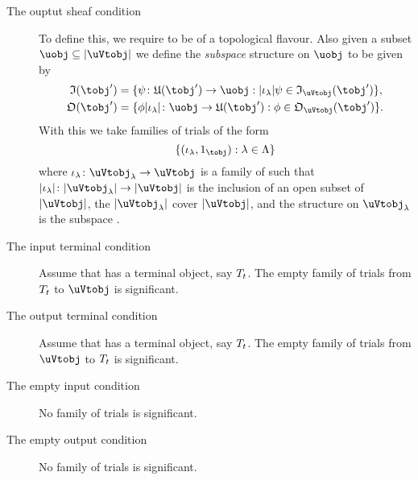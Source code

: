 \documentclass[%
a4paper,%
arxiv,%
defaults
]{myclass}
\begin{document}
\begin{defn}
\begin{description}
\item[The ouptut sheaf condition]
To define this, we require \ucat to be of a topological flavour.
Also given a subset \(\uobj \subseteq \forfunc[\uVtobj]\) we define the \emph{subspace} \Vtalgobj structure on \(\uobj\) to be given by
%
\begin{align*}
\itest(\tobj') &= \{\ifn \colon \ufunc(\tobj') \to \uobj : \forfunc[\iota_\lambda]\ifn \in \itest_{\uVtobj}(\tobj')\}, \\
%
\otest(\tobj') &= \{\ofn\forfunc[\iota_\lambda] \colon \uobj \to \ufunc(\tobj') : \ofn \in \otest_{\uVtobj}(\tobj')\}.
%
\end{align*}
%
With this we take families of trials of the form
%
\[
  \{(\iota_\lambda, 1_{\tobj}) : \lambda \in \Lambda\}
\]
%
where \(\iota_\lambda \colon \uVtobj_\lambda \to \uVtobj\) is a family of \uVtmors such that \(\forfunc[\iota_\lambda] \colon \forfunc[\uVtobj_\lambda] \to \forfunc[\uVtobj]\) is the inclusion of an open subset of \(\forfunc[\uVtobj]\), the \(\forfunc[\uVtobj_\lambda]\) cover \(\forfunc[\uVtobj]\), and the \Vtalgobj structure on \(\uVtobj_\lambda\) is the subspace \Vtalgobj.

\item[The input terminal condition]
%
Assume that \tcat has a terminal object, say \(\term{t}\).
The empty family of trials from \(\term{t}\) to \(\uVtobj\) is significant.

\item[The output terminal condition]
%
Assume that \tcat has a terminal object, say \(\term{t}\).
The empty family of trials from \(\uVtobj\) to \(\term{t}\) is significant.


\item[The empty input condition]
%
No family of trials is significant.

\item[The empty output condition]
%
No family of trials is significant.
\end{description}
\end{defn}
\end{document}
